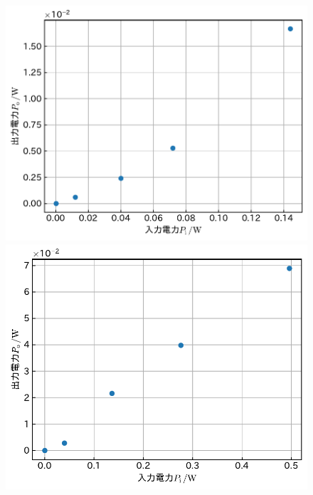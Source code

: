 \documentclass[1_power_supply.tex]{subfiles}
\begin{document}
\begin{figure}[htbp]
	\begin{minipage}{0.45\columnwidth}
		\centering
		\includegraphics[width=0.8\columnwidth]{2_10p.pdf}
		\caption{}\label{fig:2_10p}
	\end{minipage}
	\begin{minipage}{0.45\columnwidth}
		\centering
		\includegraphics[width=0.8\columnwidth]{2_25p.pdf}
		\caption{}\label{fig:2_25p}
	\end{minipage}


\end{figure}
\end{document}
